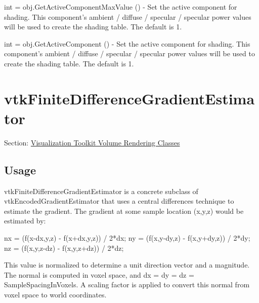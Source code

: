 \begin{DoxyItemize}
\item {\ttfamily int = obj.\-Get\-Active\-Component\-Max\-Value ()} -\/ Set the active component for shading. This component's ambient / diffuse / specular / specular power values will be used to create the shading table. The default is 1.  
\item {\ttfamily int = obj.\-Get\-Active\-Component ()} -\/ Set the active component for shading. This component's ambient / diffuse / specular / specular power values will be used to create the shading table. The default is 1.  
\end{DoxyItemize}\hypertarget{vtkvolumerendering_vtkfinitedifferencegradientestimator}{}\section{vtk\-Finite\-Difference\-Gradient\-Estimator}\label{vtkvolumerendering_vtkfinitedifferencegradientestimator}
Section\-: \hyperlink{sec_vtkvolumerendering}{Visualization Toolkit Volume Rendering Classes} \hypertarget{vtkwidgets_vtkxyplotwidget_Usage}{}\subsection{Usage}\label{vtkwidgets_vtkxyplotwidget_Usage}
vtk\-Finite\-Difference\-Gradient\-Estimator is a concrete subclass of vtk\-Encoded\-Gradient\-Estimator that uses a central differences technique to estimate the gradient. The gradient at some sample location (x,y,z) would be estimated by\-: \begin{DoxyVerb} nx = (f(x-dx,y,z) - f(x+dx,y,z)) / 2*dx;
 ny = (f(x,y-dy,z) - f(x,y+dy,z)) / 2*dy;
 nz = (f(x,y,z-dz) - f(x,y,z+dz)) / 2*dz;
\end{DoxyVerb}


This value is normalized to determine a unit direction vector and a magnitude. The normal is computed in voxel space, and dx = dy = dz = Sample\-Spacing\-In\-Voxels. A scaling factor is applied to convert this normal from voxel space to world coordinates.

